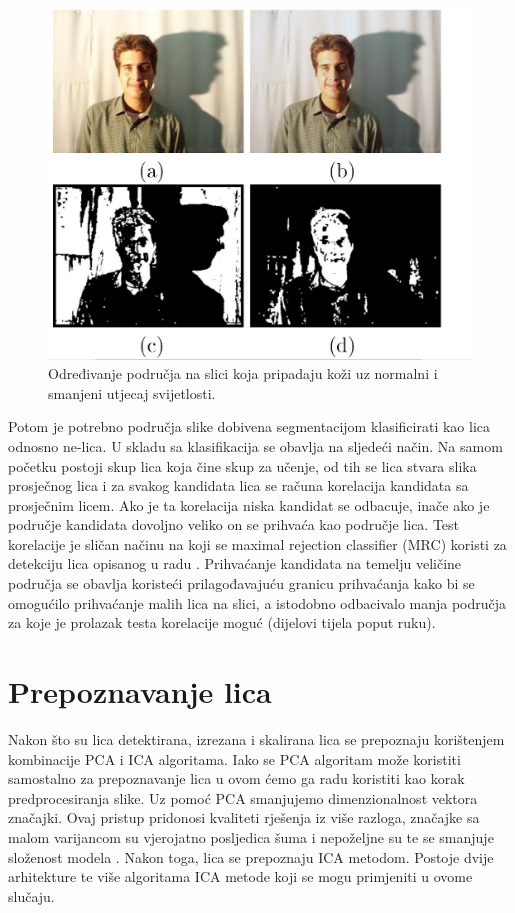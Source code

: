 \documentclass[times, utf8, seminar, numeric]{fer}
\begin{document}
\begin{figure}[!htb]
\centering
\includegraphics[width=\textwidth]{raw/skin_det.jpg}
\caption{Određivanje područja na slici koja pripadaju koži uz normalni i smanjeni utjecaj svijetlosti.}
\label{fig:skin_det}
\end{figure}

Potom je potrebno područja slike dobivena segmentacijom klasificirati kao lica odnosno ne-lica. U skladu sa \cite{conf/isda/ChandrappaR12} klasifikacija se obavlja na sljedeći način. Na samom početku postoji skup lica koja čine skup za učenje, od tih se lica stvara slika prosječnog lica i za svakog kandidata lica se računa korelacija kandidata sa prosječnim licem. Ako je ta korelacija niska kandidat se odbacuje, inače ako je područje kandidata dovoljno veliko on se prihvaća kao područje lica. Test korelacije je sličan načinu na koji se maximal rejection classifier (MRC) koristi za detekciju lica opisanog u radu \cite{Elad00patterndetection}. Prihvaćanje kandidata na temelju veličine područja se obavlja koristeći prilagođavajuću granicu prihvaćanja kako bi se omogućilo prihvaćanje malih lica na slici, a istodobno odbacivalo manja područja za koje je prolazak testa korelacije moguć (dijelovi tijela poput ruku).

\section{Prepoznavanje lica}

Nakon što su lica detektirana, izrezana i skalirana lica se prepoznaju korištenjem kombinacije PCA i ICA algoritama. Iako se PCA algoritam može koristiti samostalno za prepoznavanje lica u ovom ćemo ga radu koristiti kao korak predprocesiranja slike. Uz pomoć PCA smanjujemo dimenzionalnost vektora značajki. Ovaj pristup pridonosi kvaliteti rješenja iz više razloga, značajke sa malom varijancom su vjerojatno posljedica šuma i nepoželjne su te se smanjuje složenost modela \cite{Draper:2003:RFP:950135.950141}. Nakon toga, lica se prepoznaju ICA metodom. Postoje dvije arhitekture te više algoritama ICA metode koji se mogu primjeniti u ovome slučaju.
\end{document}
